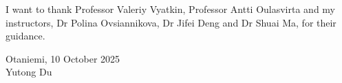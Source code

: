 \documentclass[english, 12pt, a4paper, elec, utf8, a-2b, online]{aaltothesis}
\begin{document}




I want to thank Professor Valeriy Vyatkin, Professor Antti Oulasvirta and my instructors, Dr Polina Ovsiannikova, Dr Jifei Deng and Dr Shuai Ma, for their guidance.


\vspace{5cm}
Otaniemi, 10 October 2025\\

\vspace{5mm}
{\hfill Yutong Du \hspace{1cm}}

\newpage
\end{document}
